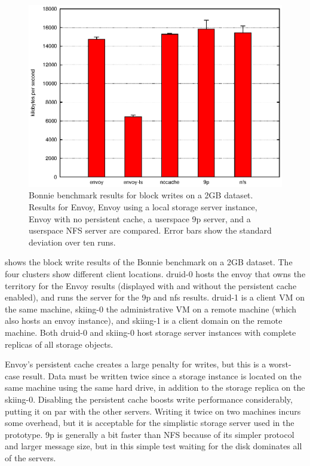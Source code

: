 \begin{figure}[t]
\centering
\includegraphics[width=\figwidth]{figures/bonnie-druid1-write}
\caption[Bonnie benchmark results for block writes]{Bonnie benchmark results for block writes on a 2GB dataset. Results for Envoy, Envoy using a local storage server instance, Envoy with no persistent cache, a userspace 9p server, and a userspace NFS server are compared. Error bars show the standard deviation over ten runs.}
\label{fig:bonnie-druid1-write}
\end{figure}

 shows the block write results of the Bonnie benchmark on a 2GB dataset. The four clusters show different client locations. druid-0 hosts the envoy that owns the territory for the Envoy results (displayed with and without the persistent cache enabled), and runs the server for the 9p and nfs results. druid-1 is a client VM on the same machine, skiing-0 the administrative VM on a remote machine (which also hosts an envoy instance), and skiing-1 is a client domain on the remote machine. Both druid-0 and skiing-0 host storage server instances with complete replicas of all storage objects.

Envoy's persistent cache creates a large penalty for writes, but this is a worst-case result. Data must be written twice since a storage instance is located on the same machine using the same hard drive, in addition to the storage replica on the skiing-0. Disabling the persistent cache boosts write performance considerably, putting it on par with the other servers. Writing it twice on two machines incurs some overhead, but it is acceptable for the simplistic storage server used in the prototype. 9p is generally a bit faster than NFS because of its simpler protocol and larger message size, but in this simple test waiting for the disk dominates all of the servers.

